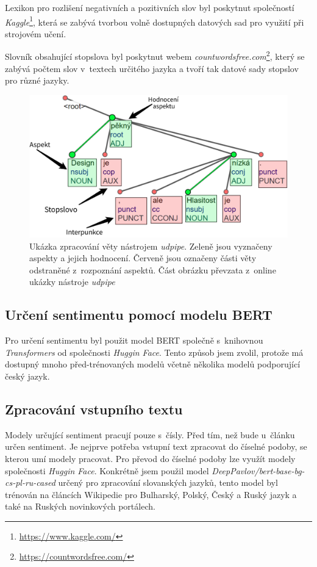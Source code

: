 Lexikon pro rozlišení negativních a pozitivních slov byl poskytnut společností \textit{Kaggle}\footnote{\url{https://www.kaggle.com/}}, která se zabývá tvorbou volně dostupných datových sad pro využití při strojovém učení.

Slovník obsahující stopslova byl poskytnut webem \textit{countwordsfree.com}\footnote{\url{https://countwordsfree.com/}}, který se zabývá počtem slov v~textech určitého jazyka a tvoří tak datové sady stopslov pro různé jazyky.

\begin{figure}[ht]
    \centering   
    \includegraphics[scale=0.45]{obrazky-figures/zpracovani_vety.pdf}
    \caption{Ukázka zpracování věty nástrojem \textit{udpipe}. Zeleně jsou vyznačeny aspekty a jejich hodnocení. Červeně jsou označeny části věty odstraněné z~rozpoznání aspektů. Část obrázku převzata z~online ukázky nástroje \textit{udpipe}}
    \label{fig:zpracovani_vety}
\end{figure}


\subsection*{Určení sentimentu pomocí modelu BERT}

Pro určení sentimentu byl použit model BERT společně s~knihovnou \textit{Transformers} od společnosti \textit{Huggin Face}. Tento způsob jsem zvolil, protože má dostupný mnoho před-trénovaných modelů včetně několika modelů podporující český jazyk. 

\subsection*{Zpracování vstupního textu}
Modely určující sentiment pracují pouze s~čísly. Před tím, než bude u~článku určen sentiment. Je nejprve potřeba vstupní text zpracovat do číselné podoby, se kterou umí modely pracovat. Pro převod do číselné podoby lze využít modely společnosti \textit{Huggin Face}. Konkrétně jsem použil model \textit{DeepPavlov/bert-base-bg-cs-pl-ru-cased} určený pro zpracování slovanských jazyků, tento model byl trénován na článcích Wikipedie pro Bulharský, Polský, Český a Ruský jazyk a také na Ruských novinkových portálech.

